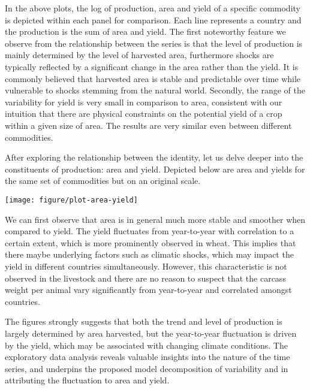 \documentclass[nojss]{jss}\usepackage[]{graphicx}\usepackage[]{color}
\newenvironment{knitrout}{}{} %
\begin{document}
In the above plots, the log of production, area and yield of a
specific commodity is depicted within each panel for comparison. Each
line represents a country and the production is the sum of area and
yield. The first noteworthy feature we observe from the relationship
between the series is that the level of production is mainly
determined by the level of harvested area, furthermore shocks are
typically reflected by a significant change in the area rather than
the yield. It is commonly believed that harvested area is stable and
predictable over time while vulnerable to shocks stemming from the
natural world.  Secondly, the range of the variability for yield is
very small in comparison to area, consistent with our intuition that
there are physical constraints on the potential yield of a crop within
a given size of area. The results are very similar even between
different commodities.

After exploring the relationship between the identity, let us delve
deeper into the constituents of production: area and yield. Depicted
below are area and yields for the same set of commodities but on an
original scale.










\begin{knitrout}
\color{fgcolor}

{\centering \texttt{[image: figure/plot-area-yield]} 

}



\end{knitrout}


We can first observe that area is in general much more stable and
smoother when compared to yield. The yield fluctuates from
year-to-year with correlation to a certain extent, which is more
prominently observed in wheat. This implies that there maybe
underlying factors such as climatic shocks, which may impact the yield
in different countries simultaneously. However, this characteristic is
not observed in the livestock and there are no reason to suspect that
the carcass weight per animal vary significantly from year-to-year and
correlated amongst countries.


The figures strongly suggests that both the trend and level of
production is largely determined by area harvested, but the
year-to-year fluctuation is driven by the yield, which may be
associated with changing climate conditions. The exploratory data
analysis reveals valuable insights into the nature of the time series,
and underpins the proposed model decomposition of variability and in
attributing the fluctuation to area and yield.
\end{document}
